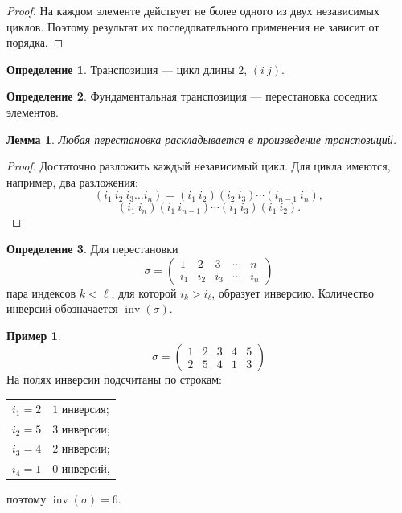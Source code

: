 \documentclass[12pt,a4paper,oneside,openany]{book}
\theoremstyle{definition}
\newtheorem{definition}{Определение}[chapter]
\newtheorem{example}{Пример}[chapter]
\theoremstyle{plain}
\newtheorem{lemma}{Лемма}[chapter]
\theoremstyle{remark}
\DeclareMathOperator{\inv}{inv}
\begin{document}
\begin{proof}
На каждом элементе действует не более одного из двух независимых циклов.
Поэтому результат их последовательного применения не зависит от
порядка.
\end{proof}

\begin{definition}
Транспозиция --- цикл длины \(2\), \((i\ j)\).
\end{definition}

\begin{definition}
Фундаментальная транспозиция --- перестановка соседних элементов.
\end{definition}

\begin{lemma}
Любая перестановка раскладывается в произведение транспозиций.
\end{lemma}

\begin{proof}
Достаточно разложить каждый независимый цикл. Для цикла имеются,
например, два разложения:
\[
  (i_1\ i_2\ i_3\ldots i_n)
  =(i_1\ i_2)(i_2\ i_3)\cdots(i_{n-1}\ i_n),
\]
\[
  (i_1\ i_n)(i_1\ i_{n-1})\cdots(i_1\ i_3)(i_1\ i_2).
\]
\end{proof}

\begin{definition}
Для перестановки
\[
  \sigma=
  \begin{pmatrix}
  1&2&3&\cdots&n\\
  i_1&i_2&i_3&\cdots&i_n
  \end{pmatrix}
\]
пара индексов \(k<\ell\), для которой \(i_k>i_\ell\), образует
инверсию. Количество инверсий обозначается \(\inv(\sigma)\).
\end{definition}

\begin{example}
\[
  \sigma=
  \begin{pmatrix}
  1&2&3&4&5\\
  2&5&4&1&3
  \end{pmatrix}
\]
На полях инверсии подсчитаны по строкам:

\begin{center}
\begin{tabular}{c@{$\;-\;$}l}
  \(i_1=2\) & \(1\) инверсия;\\
  \(i_2=5\) & \(3\) инверсии;\\
  \(i_3=4\) & \(2\) инверсии;\\
  \(i_4=1\) & \(0\) инверсий,
\end{tabular}
\qquad поэтому \(\inv(\sigma)=6\).
\end{center}
\end{example}
\end{document}
